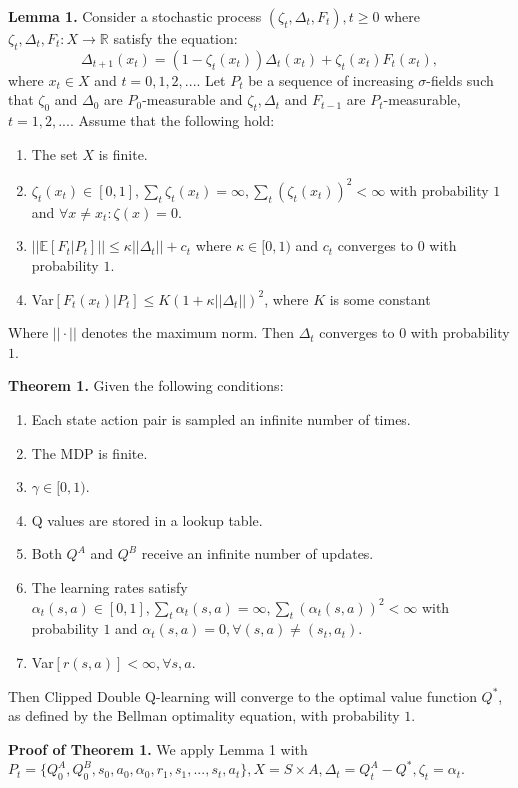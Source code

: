 \documentclass{article}
\newcommand{\y}{\gamma}
\newcommand{\E}{\mathbb{E}}
\newcommand{\lb}{\left [}
\newcommand{\rb}{\right ]}
\begin{document}
\textbf{Lemma 1.} Consider a stochastic process $(\zeta_t, \Delta_t, F_t), t \geq 0$ where $\zeta_t, \Delta_t, F_t: X \rightarrow \mathbb{R}$ satisfy the equation:
\begin{equation}
\Delta_{t+1}(x_t) = (1 - \zeta_t(x_t))\Delta_t(x_t) + \zeta_t(x_t)F_t(x_t),
\end{equation}
where $x_t \in X$ and $t=0,1,2,...$. Let $P_t$ be a sequence of increasing $\sigma$-fields such that $\zeta_0$ and $\Delta_0$ are $P_0$-measurable and $\zeta_t, \Delta_t$ and $F_{t-1}$ are $P_t$-measurable, $t=1,2,...$. Assume that the following hold:
\begin{enumerate}[topsep=0pt]
\item The set $X$ is finite.
\item $\zeta_t(x_t) \in [0,1], \sum_t \zeta_t(x_t) = \infty, \sum_t (\zeta_t(x_t))^2 < \infty$ with probability $1$ and $\forall x \neq x_t : \zeta(x) = 0$.
\item $|| \E \lb F_t | P_t \rb || \leq \kappa || \Delta_t || + c_t$ where $\kappa \in [0,1)$ and $c_t$ converges to $0$ with probability $1$.
\item Var$\lb F_t(x_t)|P_t \rb \leq K(1 + \kappa||\Delta_t||)^2$, where $K$ is some constant 
\end{enumerate}
Where $||\cdot||$ denotes the maximum norm. Then $\Delta_t$ converges to $0$ with probability $1$. 

\textbf{Theorem 1.} Given the following conditions:
\begin{enumerate}[topsep=0pt]
\item Each state action pair is sampled an infinite number of times. 
\item The MDP is finite. 
\item $\y \in [0,1)$.
\item Q values are stored in a lookup table.
\item Both $Q^A$ and $Q^B$ receive an infinite number of updates.
\item The learning rates satisfy $\alpha_t(s,a) \in [0,1], \sum_t \alpha_t(s,a) = \infty, \sum_t(\alpha_t(s,a))^2 < \infty$ with probability $1$ and $\alpha_t(s,a) = 0, \forall(s,a) \neq (s_t,a_t)$.
\item Var$\lb r(s,a) \rb < \infty, \forall s,a$. 
\end{enumerate}
Then Clipped Double Q-learning will converge to the optimal value function $Q^*$, as defined by the Bellman optimality equation, with probability $1$.

\textbf{Proof of Theorem 1.} We apply Lemma 1 with $P_t = \{Q^A_0, Q^B_0, s_0, a_0, \alpha_0, r_1, s_1, ..., s_t, a_t\}, X = S \times A, \Delta_t = Q^A_t - Q^*, \zeta_t = \alpha_t$.  
\end{document}
